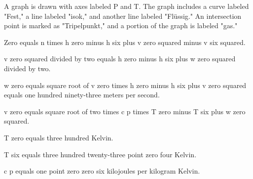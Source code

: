 A graph is drawn with axes labeled P and T. The graph includes a curve labeled "Fest," a line labeled "isok," and another line labeled "Flüssig." An intersection point is marked as "Tripelpunkt," and a portion of the graph is labeled "gas."

Zero equals n times h zero minus h six plus v zero squared minus v six squared.

v zero squared divided by two equals h zero minus h six plus w zero squared divided by two.

w zero equals square root of v zero times h zero minus h six plus v zero squared equals one hundred ninety-three meters per second.

v zero equals square root of two times c p times T zero minus T six plus w zero squared.

T zero equals three hundred Kelvin.

T six equals three hundred twenty-three point zero four Kelvin.

c p equals one point zero zero six kilojoules per kilogram Kelvin.